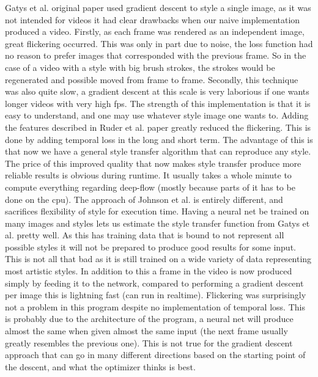 Gatys et al. \cite{Gatys:1} original paper used gradient descent to style a single image, as it was not intended for videos it had clear drawbacks when our naive implementation produced a video. Firstly, as each frame was rendered as an independent image, great flickering occurred. This was only in part due to noise, the loss function had no reason to prefer images that corresponded with the previous frame. So in the case of a video with a style with big brush strokes, the strokes would be regenerated and possible moved from frame to frame. Secondly, this technique was also quite slow, a gradient descent at this scale is very laborious if one wants longer videos with very high fps. The strength of this implementation is that it is easy to understand, and one may use whatever style image one wants to.\newline\newline
Adding the features described in Ruder et al. \cite{Ruder:1} paper greatly reduced the flickering. This is done by adding temporal loss in the long and short term. The advantage of this is that now we have a general style transfer algorithm that can reproduce any style. The price of this improved quality that now makes style transfer produce more reliable results is obvious during runtime. It usually takes a whole minute to compute everything regarding deep-flow (mostly because parts of it has to be done on the cpu).\newline\newline
The approach of Johnson et al. \cite{Johnson:1} is entirely different, and sacrifices flexibility of style for execution time. Having a neural net be trained on many images and styles lets us estimate the style transfer function from Gatys et al. \cite{Gatys:1} pretty well. As this has training data that is bound to not represent all possible styles it will not be prepared to produce good results for some input. This is not all that bad as it is still trained on a wide variety of data representing most artistic styles. In addition to this a frame in the video is now produced simply by feeding it to the network, compared to performing a gradient descent per image this is lightning fast (can run in realtime). Flickering was surprisingly not a problem in this program despite no implementation of temporal loss. This is probably due to the architecture of the program, a neural net will produce almost the same when given almost the same input (the next frame usually greatly resembles the previous one). This is not true for the gradient descent approach that can go in many different directions based on the starting point of the descent, and what the optimizer thinks is best.\newline\newline
